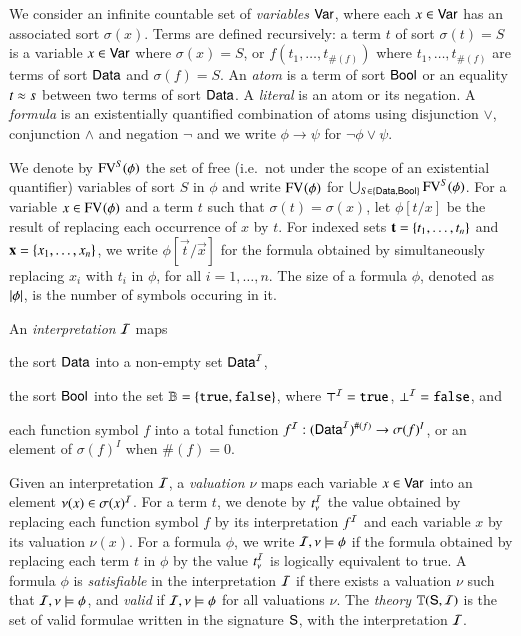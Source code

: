 \documentclass[10pt,conference,letterpaper,twocolumn]{IEEEtran}
\begin{document}
We consider an infinite countable set of \emph{variables} $\mathsf{Var}$,
where each $x \in \mathsf{Var}$ has an associated sort $\sigma(x)$. Terms are
defined recursively: a term $t$ of sort $\sigma(t)=S$ is a variable $x
\in \mathsf{Var}$ where $\sigma(x)=S$, or $f(t_1,\ldots,t_{\#(f)})$ where
$t_1,\ldots,t_{\#(f)}$ are terms of sort $\mathsf{Data}$ and $\sigma(f)=S$. An
\emph{atom} is a term of sort $\mathsf{Bool}$ or an equality $t \approx s$
between two terms of sort $\mathsf{Data}$. A \emph{literal} is an atom or its
negation. A \emph{formula} is an existentially quantified combination
of atoms using disjunction $\vee$, conjunction $\wedge$ and negation
$\neg$ and we write $\phi \rightarrow \psi$ for $\neg\phi \vee \psi$.

We denote by $\mathrm{FV}^{S}(\phi)$ the set of free (i.e.\ not under the scope
of an existential quantifier) variables of sort $S$ in $\phi$ and
write $\mathrm{FV}^{}(\phi)$ for $\bigcup_{S \in \left\{ \mathsf{Data},\mathsf{Bool} \right\}}
\mathrm{FV}^{S}(\phi)$. For a variable $x \in \mathrm{FV}^{}(\phi)$ and a term $t$ such
that $\sigma(t) = \sigma(x)$, let $\phi[t/x]$ be the result of
replacing each occurrence of $x$ by $t$. For indexed sets
$\mathbf t=\left\{ t_1,\ldots,t_n \right\}$ and $\mathbf x=\left\{ x_1,\ldots,x_n \right\}$, we
write $\phi[\vec{t}/\vec{x}]$ for the formula obtained by
simultaneously replacing $x_i$ with $t_i$ in $\phi$, for all
$i=1,\ldots,n$.
%
%
The size of a formula $\phi$, denoted as ${|{\phi}|}$, is the number
of symbols occuring in it.

An \emph{interpretation} $\mathcal{I}$ maps\begin{inparaenum}[(1)]
\item the sort $\mathsf{Data}$ into a non-empty set $\mathsf{Data}^{\mathcal{I}}$, 
%
\item the sort $\mathsf{Bool}$ into the set $\mathbb{B} = \left\{ \mathtt{true},\mathtt{false} \right\}$, where
  $\top^{\mathcal{I}} = \mathtt{true}$, $\bot^{\mathcal{I}} = \mathtt{false}$, and
%
\item each function symbol $f$ into a total function $f^{\mathcal{I}} :
  (\mathsf{Data}^{\mathcal{I}})^{\#(f)} \rightarrow \sigma(f)^I$, or an element of
  $\sigma(f)^I$ when $\#(f)=0$.
\end{inparaenum}
Given an interpretation $\mathcal{I}$, a \emph{valuation} $\nu$ maps each
variable $x \in \mathsf{Var}$ into an element $\nu(x) \in \sigma(x)^{\mathcal{I}}$. For
a term $t$, we denote by $t^{\mathcal{I}}_\nu$ the value obtained by replacing
each function symbol $f$ by its interpretation $f^{\mathcal{I}}$ and each
variable $x$ by its valuation $\nu(x)$. For a formula $\phi$, we write
$\mathcal{I},\nu \models \phi$ if the formula obtained by replacing each term
$t$ in $\phi$ by the value $t^{\mathcal{I}}_\nu$ is logically equivalent to true.
A formula $\phi$ is \emph{satisfiable} in the interpretation $\mathcal{I}$ if
there exists a valuation $\nu$ such that $\mathcal{I},\nu \models \phi$, and
\emph{valid} if $\mathcal{I},\nu \models \phi$ for all valuations $\nu$.  The
\emph{theory} $\mathbb{T}(\mathsf{S},\mathcal{I})$ is the set of valid formulae written
in the signature $\mathsf{S}$, with the interpretation $\mathcal{I}$.
\end{document}
